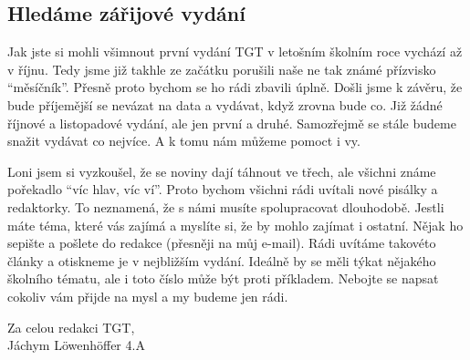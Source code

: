 \documentclass[12pt, a4paper]{article}
\begin{document}
	\begin{multicols*}{2}
		\setlength{\columnseprule}{1pt}
		
		
		\begin{center}\section*{Hledáme zářijové vydání} \end{center}
		Jak jste si mohli všimnout první vydání TGT v letošním školním roce vychází až v říjnu. Tedy jsme již takhle ze začátku porušili naše ne tak známé přízvisko “měsíčník”. Přesně proto bychom se ho rádi zbavili úplně. Došli jsme k závěru, že bude příjemější se nevázat na data a vydávat, když zrovna bude co. Již žádné říjnové a listopadové vydání, ale jen první a druhé. Samozřejmě se stále budeme snažit vydávat co nejvíce. A k tomu nám můžeme pomoct i vy. \par
		Loni jsem si vyzkoušel, že se noviny dají táhnout ve třech, ale všichni známe pořekadlo “víc hlav, víc ví”. Proto bychom všichni rádi uvítali nové pisálky a redaktorky. To neznamená, že s námi musíte spolupracovat dlouhodobě. Jestli máte téma, které vás zajímá a myslíte si, že by mohlo zajímat i ostatní. Nějak ho sepište a pošlete do redakce (přesněji na můj e-mail). Rádi uvítáme takovéto články a otiskneme je v nejbližším vydání. Ideálně by se měli týkat nějakého školního tématu, ale i toto číslo může být proti příkladem. Nebojte se napsat cokoliv vám přijde na mysl a my budeme jen rádi. \par 
		\begin{flushright}
			Za celou redakci TGT,\\Jáchym Löwenhöffer 4.A
		\end{flushright}
		
		
		
	\end{multicols*}
\end{document}
